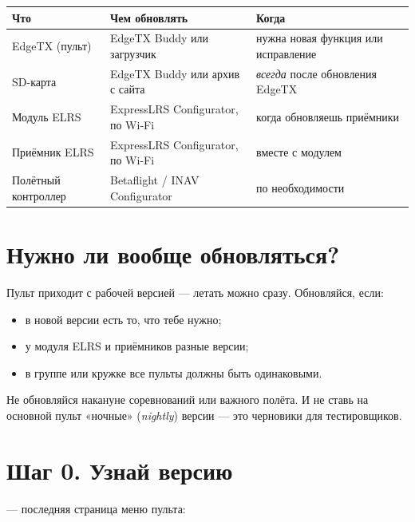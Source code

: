 \begin{center}\small
\renewcommand{\arraystretch}{1.25}
\begin{tabularx}{\linewidth}{@{}L{32mm}L{42mm}Y@{}}
\toprule
\textbf{Что} & \textbf{Чем обновлять} & \textbf{Когда} \\
\midrule
EdgeTX (пульт) & EdgeTX Buddy или загрузчик & нужна новая функция или исправление \\
SD-карта & EdgeTX Buddy или архив с сайта & \emph{всегда} после обновления EdgeTX \\
Модуль ELRS & ExpressLRS Configurator, по Wi-Fi & когда обновляешь приёмники \\
Приёмник ELRS & ExpressLRS Configurator, по Wi-Fi & вместе с модулем \\
Полётный контроллер & Betaflight / INAV Configurator & по необходимости \\
\bottomrule
\end{tabularx}
\end{center}

\section{Нужно ли вообще обновляться?}

Пульт приходит с рабочей версией --- летать можно сразу. Обновляйся, если:
\begin{itemize}
  \item в новой версии есть то, что тебе нужно;
  \item у модуля ELRS и приёмников разные версии;
  \item в группе или кружке все пульты должны быть одинаковыми.
\end{itemize}

\begin{caution}
Не обновляйся накануне соревнований или важного полёта. И не ставь на основной пульт
«ночные» (\emph{nightly}) версии --- это черновики для тестировщиков.
\end{caution}

\section{Шаг 0. Узнай версию}

 --- последняя страница меню пульта:

\begin{center}
\end{center}

